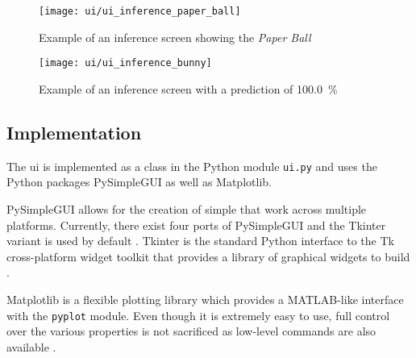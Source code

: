 \begin{figure}
  \centering
  \texttt{[image: ui/ui\_inference\_paper\_ball]}
  \caption{Example of an inference screen showing the \textit{Paper Ball}}
  \label{fig:ui_inference_paper_ball}
\end{figure}

\begin{figure}
  \centering
  \texttt{[image: ui/ui\_inference\_bunny]}
  \caption{Example of an inference screen with a prediction of \SI{100.0}{\percent}}
  \label{fig:ui_inference_bunny}
\end{figure}





\subsection{Implementation}
\label{subsec:inference:user_interface:implementation}

The \acrlong{ui} is implemented as a class in the Python module \texttt{ui.py} and uses the Python packages PySimpleGUI as well as Matplotlib.

PySimpleGUI allows for the creation of simple  that work across multiple platforms.
Currently, there exist four ports of PySimpleGUI and the Tkinter variant is used by default \cite{}. %
Tkinter is the standard Python interface to the Tk cross-platform widget toolkit that provides a library of graphical widgets to build  \cite{}. %

Matplotlib is a flexible plotting library which provides a MATLAB-like interface with the \texttt{pyplot} module.
Even though it is extremely easy to use, full control over the various properties is not sacrificed as low-level commands are also available \cite{}. %

